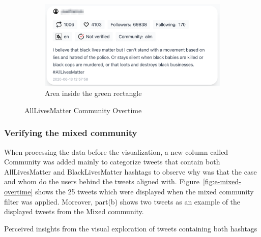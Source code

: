\begin{figure}[H]
\begin{subfigure}{.5\textwidth}
  
  \includegraphics[width=1\linewidth]{Report-latex/tex_files/pics/example/obser7.png}
 \caption{Area inside the green rectangle}
  \label{fig:sub-fourth}
\end{subfigure}

\captionsetup{justification=centering}
\caption{AllLivesMatter Community Overtime}
\label{fig:e-alm-overtime}
\end{figure}


\subsubsection{Verifying the mixed community}

When processing the data before the visualization, a new column called Community was added mainly to categorize tweets that contain both AllLivesMatter and BlackLivesMatter hashtags to observe why was that the case and whom do the users behind the tweets aligned with. Figure~\ref{fig:e-mixed-overtime} shows the 25 tweets which were displayed when the mixed community filter was applied. Moreover, part(b) shows two tweets as an example of the displayed tweets from the Mixed community. 


Perceived insights from the visual exploration of tweets containing both hashtags


